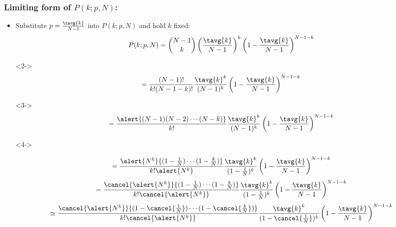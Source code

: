 \begin{frame}[label=]
  \frametitle{Limiting form of $P(k;p,N)$:}

    \small
    \begin{itemize}
    \item<1->
      Substitute $p = \frac{\tavg{k}}{N-1}$ into $P(k;p,N)$
      and hold $k$ fixed:
      $$
      P(k;p,N) = \binom{N-1}{k} 
      \left(
      \frac{\tavg{k}}{N-1}
      \right)^k 
      \left(
      1-\frac{\tavg{k}}{N-1}
      \right)^{N-1-k}
      $$
    \item[]<2->
      $$
      = 
      \frac{(N-1)!}
      {k!(N-1-k)!}
      \frac{\tavg{k}^k}{(N-1)^k}
      \left(
      1-\frac{\tavg{k}}{N-1}
      \right)^{N-1-k}
      $$
    \item[]<3->
      $$
      = 
      \frac{\alert{(N-1)(N-2)\cdots(N-k)}}
      {k!}
      \frac{\tavg{k}^k}{(N-1)^k}
      \left(
      1-\frac{\tavg{k}}{N-1}
      \right)^{N-1-k}
      $$
    \item[]<4->
      \begin{overprint}
      $$
      =
      \frac{\alert{N^k}
        {(1-\frac{1}{N})\cdots(1-\frac{k}{N})}}
      {k! \alert{N^k}}
      \frac{\tavg{k}^k}{(1-\frac{1}{N})^k}
      \left(
      1-\frac{\tavg{k}}{N-1}
      \right)^{N-1-k}
      $$
      $$
      =
      \frac{\cancel{\alert{N^k}}
        {(1-{\frac{1}{N}})\cdots(1-\frac{k}{N})}}
      {k! \cancel{\alert{N^k}}}
      \frac{\tavg{k}^k}{(1-\frac{1}{N})^k}
      \left(
      1-\frac{\tavg{k}}{N-1}
      \right)^{N-1-k}
      $$
      $$
      \simeq
      \frac{\cancel{\alert{N^k}}
        {(1-\cancel{\frac{1}{N}})\cdots(1-\cancel{\frac{k}{N}})}}
      {k! \cancel{\alert{N^k}}}
      \frac{\tavg{k}^k}{(1-\cancel{\frac{1}{N}})^k}
      \left(
      1-\frac{\tavg{k}}{N-1}
      \right)^{N-1-k}
      $$
      \end{overprint}
    \end{itemize}

\end{frame}

